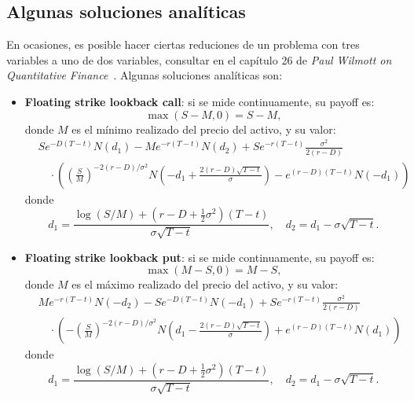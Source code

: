 \subsection{Algunas soluciones analíticas}
En ocasiones, es posible hacer ciertas reduciones de un problema con tres variables a uno de dos variables, consultar en el capítulo 26 de \textit{Paul Wilmott on Quantitative Finance}~\cite{PaulWilmott2006}. Algunas soluciones analíticas son:
\begin{itemize}
    \item \textbf{Floating strike lookback call}: si se mide continuamente, su payoff es:
    \begin{equation*}
        \max(S - M, 0) = S - M,
    \end{equation*}
    donde $M$ es el mínimo realizado del precio del activo, y su valor:
    \begin{equation*}
        \boxed{
            \begin{aligned}
                & Se^{-D(T-t)} N(d_1) - Me^{-r(T-t)} N(d_2) + Se^{-r(T-t)} \frac{\sigma^2}{2(r-D)} \\
                & \quad \cdot \left( \left( \frac{S}{M} \right)^{-2(r-D)/\sigma^2} N\left(-d_1 + \frac{2(r-D)\sqrt{T-t}}{\sigma}\right) - e^{(r-D)(T-t)} N(-d_1) \right)
            \end{aligned}
        }
    \end{equation*}
    donde
    \begin{equation*}
        d_1 = \frac{\log(S/M) + (r-D + \frac{1}{2}\sigma^2)(T-t)}{\sigma\sqrt{T-t}}, \quad d_2 = d_1 - \sigma\sqrt{T-t}.
    \end{equation*}

    \item \textbf{Floating strike lookback put}: si se mide continuamente, su payoff es:
    \begin{equation*}
        \max(M - S, 0) = M - S,
    \end{equation*}
    donde $M$ es el máximo realizado del precio del activo, y su valor:
    \begin{equation*}
        \boxed{
            \begin{aligned}
                & Me^{-r(T-t)} N(-d_2) - Se^{-D(T-t)} N(-d_1) + Se^{-r(T-t)} \frac{\sigma^2}{2(r-D)} \\
                & \quad \cdot \left( -\left( \frac{S}{M} \right)^{-2(r-D)/\sigma^2} N\left(d_1 - \frac{2(r-D)\sqrt{T-t}}{\sigma}\right) + e^{(r-D)(T-t)} N(d_1) \right)
            \end{aligned}
        }
    \end{equation*}
    donde
    \begin{equation*}
        d_1 = \frac{\log(S/M) + (r-D + \frac{1}{2}\sigma^2)(T-t)}{\sigma\sqrt{T-t}}, \quad d_2 = d_1 - \sigma\sqrt{T-t}.
    \end{equation*}


\end{itemize}

